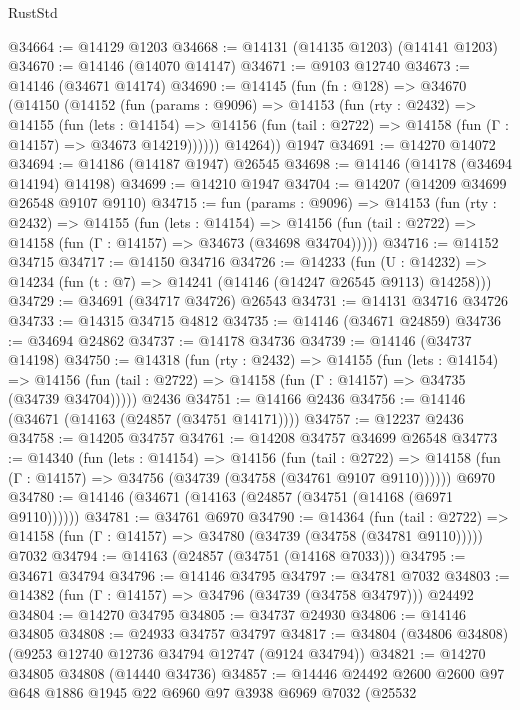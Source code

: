 \begin{lexlean}{RustStd}
\begin{coremodule}
@34664 := @14129 @1203
@34668 := @14131 (@14135 @1203) (@14141 @1203)
@34670 := @14146 (@14070 @14147)
@34671 := @9103 @12740
@34673 := @14146 (@34671 @14174)
@34690 := @14145
    (fun (fn : @128) =>
    @34670
      (@14150
        (@14152
          (fun (params : @9096) =>
          @14153
            (fun (rty : @2432) =>
            @14155
              (fun (lets : @14154) =>
              @14156 (fun (tail : @2722) => @14158 (fun (Γ : @14157) => @34673 @14219))))))
        @14264))
    @1947
@34691 := @14270 @14072
@34694 := @14186 (@14187 @1947) @26545
@34698 := @14146 (@14178 (@34694 @14194) @14198)
@34699 := @14210 @1947
@34704 := @14207 (@14209 @34699 @26548 @9107 @9110)
@34715 := fun (params : @9096) =>
  @14153
    (fun (rty : @2432) =>
    @14155
      (fun (lets : @14154) =>
      @14156 (fun (tail : @2722) => @14158 (fun (Γ : @14157) => @34673 (@34698 @34704)))))
@34716 := @14152 @34715
@34717 := @14150 @34716
@34726 := @14233
    (fun (U : @14232) => @14234 (fun (t : @7) => @14241 (@14146 (@14247 @26545 @9113) @14258)))
@34729 := @34691 (@34717 @34726) @26543
@34731 := @14131 @34716 @34726
@34733 := @14315 @34715 @4812
@34735 := @14146 (@34671 @24859)
@34736 := @34694 @24862
@34737 := @14178 @34736
@34739 := @14146 (@34737 @14198)
@34750 := @14318
    (fun (rty : @2432) =>
    @14155
      (fun (lets : @14154) =>
      @14156 (fun (tail : @2722) => @14158 (fun (Γ : @14157) => @34735 (@34739 @34704)))))
    @2436
@34751 := @14166 @2436
@34756 := @14146 (@34671 (@14163 (@24857 (@34751 @14171))))
@34757 := @12237 @2436
@34758 := @14205 @34757
@34761 := @14208 @34757 @34699 @26548
@34773 := @14340
    (fun (lets : @14154) =>
    @14156
      (fun (tail : @2722) =>
      @14158 (fun (Γ : @14157) => @34756 (@34739 (@34758 (@34761 @9107 @9110))))))
    @6970
@34780 := @14146 (@34671 (@14163 (@24857 (@34751 (@14168 (@6971 @9110))))))
@34781 := @34761 @6970
@34790 := @14364
    (fun (tail : @2722) => @14158 (fun (Γ : @14157) => @34780 (@34739 (@34758 (@34781 @9110)))))
    @7032
@34794 := @14163 (@24857 (@34751 (@14168 @7033)))
@34795 := @34671 @34794
@34796 := @14146 @34795
@34797 := @34781 @7032
@34803 := @14382 (fun (Γ : @14157) => @34796 (@34739 (@34758 @34797))) @24492
@34804 := @14270 @34795
@34805 := @34737 @24930
@34806 := @14146 @34805
@34808 := @24933 @34757 @34797
@34817 := @34804 (@34806 @34808) (@9253 @12740 @12736 @34794 @12747 (@9124 @34794))
@34821 := @14270 @34805 @34808 (@14440 @34736)
@34857 := @14446
    @24492
    @2600
    @2600
    @97
    @648
    @1886
    @1945
    @22
    @6960
    @97
    @3938
    @6969
    @7032
    (@25532

\end{coremodule}
\end{lexlean}
